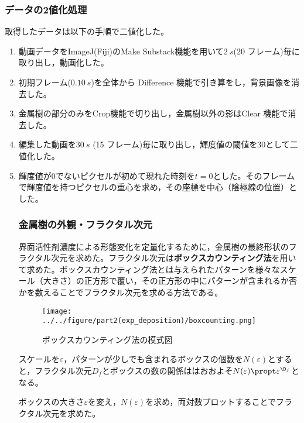 \documentclass[autodetect-engine,dvi=dvipdfmx,a4paper,ja=standard,oneside,openany,11pt,draft]{bxjsbook}
\begin{document}
\subsubsection{データの2値化処理}
取得したデータは以下の手順で二値化した。
\begin{enumerate}
\item 動画データをImageJ(Fiji)のMake Substack機能を用いて$\SI{2}{s}$(20 フレーム)毎に取り出し，動画化した。
\item 初期フレーム($\SI{0.10}{s}$)を全体から Difference 機能で引き算をし，背景画像を消去した。
\item 金属樹の部分のみをCrop機能で切り出し，金属樹以外の影はClear 機能で消去した。
\item 編集した動画を$\SI{30}{s}$ (15 フレーム)毎に取り出し，輝度値の閾値を30として二値化した。
\item 輝度値が0でないピクセルが初めて現れた時刻を$t=0$とした。そのフレームで輝度値を持つピクセルの重心を求め，その座標を中心（陰極線の位置）とした。

\subsubsection{金属樹の外観・フラクタル次元}
界面活性剤濃度による形態変化を定量化するために，金属樹の最終形状のフラクタル次元を求めた。フラクタル次元は\textbf{ボックスカウンティング法}を用いて求めた。ボックスカウンティング法とは与えられたパターンを様々なスケール（大きさ）の正方形で覆い，その正方形の中にパターンが含まれるか否かを数えることでフラクタル次元を求める方法である。
\begin{figure}[H]
  \centering
  \texttt{[image: ../../figure/part2(exp\_deposition)/boxcounting.png]}
  \caption{ボックスカウンティング法の模式図\cite{表面粗さ曲線のフラクタル解析}}
  \label{fig:box_counting}
\end{figure}
スケールを$\varepsilon$，パターンが少しでも含まれるボックスの個数を$N(\varepsilon)$とすると，フラクタル次元$D_f$とボックスの数の関係ははおおよそ$N(\varepsilon)\propt\varepsilon^{\D_f}$となる。

ボックスの大きさ$\varepsilon$を変え，$N(\varepsilon)$を求め，両対数プロットすることでフラクタル次元を求めた。

\end{enumerate}
\end{document}
